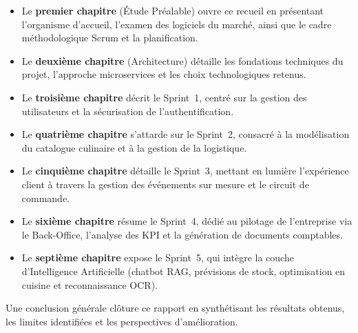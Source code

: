 \begin{itemize}
    \item Le \textbf{premier chapitre} (Étude Préalable) ouvre ce recueil en présentant l'organisme d'accueil, l'examen des logiciels du marché, ainsi que le cadre méthodologique Scrum et la planification.
    \item Le \textbf{deuxième chapitre} (Architecture) détaille les fondations techniques du projet, l'approche microservices et les choix technologiques retenus.
    \item Le \textbf{troisième chapitre} décrit le Sprint~1, centré sur la gestion des utilisateurs et la sécurisation de l'authentification.
    \item Le \textbf{quatrième chapitre} s'attarde sur le Sprint~2, consacré à la modélisation du catalogue culinaire et à la gestion de la logistique.
    \item Le \textbf{cinquième chapitre} détaille le Sprint~3, mettant en lumière l'expérience client à travers la gestion des événements sur mesure et le circuit de commande.
    \item Le \textbf{sixième chapitre} résume le Sprint~4, dédié au pilotage de l'entreprise via le Back-Office, l'analyse des KPI et la génération de documents comptables.
    \item Le \textbf{septième chapitre} expose le Sprint~5, qui intègre la couche d'Intelligence Artificielle (chatbot RAG, prévisions de stock, optimisation en cuisine et reconnaissance OCR).
\end{itemize}

Une conclusion générale clôture ce rapport en synthétisant les résultats obtenus, les limites identifiées et les perspectives d'amélioration.

